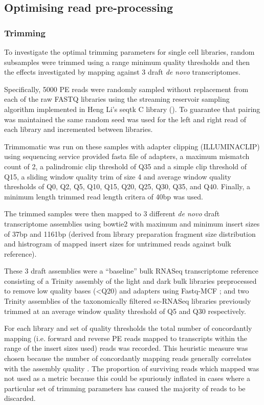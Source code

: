 \subsection{Optimising read pre-processing}

\subsubsection{Trimming}

To investigate the optimal trimming parameters for single cell libraries, 
random subsamples were trimmed using a range minimum quality thresholds and then the effects investigated
by mapping against 3 draft \textit{de novo} transcriptomes.


Specifically, 5000 PE reads were randomly sampled without replacement from each of the raw FASTQ libraries 
using the streaming reservoir sampling \citep{Vitter1985} algorithm implemented in Heng Li's 
seqtk C library (\citep{SeqtkGitHub}).
To guarantee that pairing was maintained the same random seed was used for the left and right read
of each library and incremented between libraries.

Trimmomatic \citep{Bolger2014a} was run on these samples with adapter clipping (ILLUMINACLIP)
using sequencing service provided fasta file of adapters, a maximum mismatch count of 2,
a palindromic clip threshold of Q35 and a simple clip threshold of Q15, a sliding window
quality trim of size 4 and average window quality thresholds of Q0, Q2, Q5, Q10, Q15, Q20, Q25, Q30, Q35, and Q40.
Finally, a minimum length trimmed read length critera of 40bp was used.  


The trimmed samples were then mapped to 3 different \textit{de novo} draft transcriptome assemblies using bowtie2
\citep{Langmead2012} with maximum and minimum insert sizes of 37bp and 1161bp (derived from library preparation
fragment size distribution and histrogram of mapped insert sizes for untrimmed reads against bulk reference).

These 3 draft assemblies were a ``baseline'' bulk RNASeq transcriptome reference consisting of a Trinity \citep{Haas2013} assembly of the light and dark
bulk libraries preprocessed to remove low quality bases (<Q20) and adapters using Fastq-MCF \citep{Aronesty2013};
and two Trinity assemblies of the taxonomically filtered sc-RNASeq libraries previously trimmed 
    at an average window quality threshold of Q5 and Q30 respectively.


For each library and set of quality thresholds the total number of concordantly
mapping (i.e. forward and reverse PE reads mapped to transcripts within the range of the insert sizes used)
reads was recorded.  This heuristic measure was chosen because the number of concordantly mapping reads generally correlates
with the assembly quality \citep{Macmanes2014}. The proportion of surviving reads which mapped 
was not used as a metric because this could be spuriously inflated in cases where a particular
set of trimming parameters has caused the majority of reads to be discarded.

